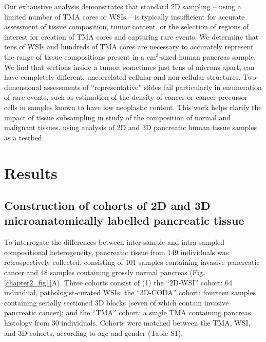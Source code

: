 \begin{refsection}
    Our exhaustive analysis demonstrates that standard 2D sampling – using a limited number of TMA cores or WSIs  – is typically insufficient for accurate assessment of tissue composition, tumor content, or the selection of regions of interest for creation of TMA cores and capturing rare events\cite{Kiemen2023Intraparenchymal}. We determine that tens of WSIs and hundreds of TMA cores are necessary to accurately represent the range of tissue compositions present in a cm$^3$-sized human pancreas sample. We find that sections inside a tumor, sometimes just tens of microns apart, can have completely different, uncorrelated cellular and non-cellular structures. Two-dimensional assessments of “representative” slides fail particularly in enumeration of rare events, such as estimation of the density of cancer or cancer precursor cells in samples known to have low neoplastic content\cite{Koyuncu2023Visual,Kiemen2023Intraparenchymal}. This work helps clarify the impact of tissue subsampling in study of the composition of normal and malignant tissues, using analysis of 2D and 3D pancreatic human tissue samples as a testbed. 
    
    \section{Results}
    
    \subsection{Construction of cohorts of 2D and 3D microanatomically labelled pancreatic tissue}
    To interrogate the differences between inter-sample and intra-sampled compositional heterogeneity, pancreatic tissue from 149 individuals was retrospectively collected, consisting of 101 samples containing invasive pancreatic cancer and 48 samples containing grossly normal pancreas (Fig. \ref{chapter2_fig1}A). Three cohorts consist of (1) the “2D-WSI” cohort: 64 individual, pathologist-curated WSIs; the “3D-CODA” cohort: fourteen samples containing serially sectioned 3D blocks (seven of which contain invasive pancreatic cancer); and the “TMA” cohort: a single TMA containing pancreas histology from 30 individuals. Cohorts were matched between the TMA, WSI, and 3D cohorts, according to age and gender (Table S1).


\end{refsection}
